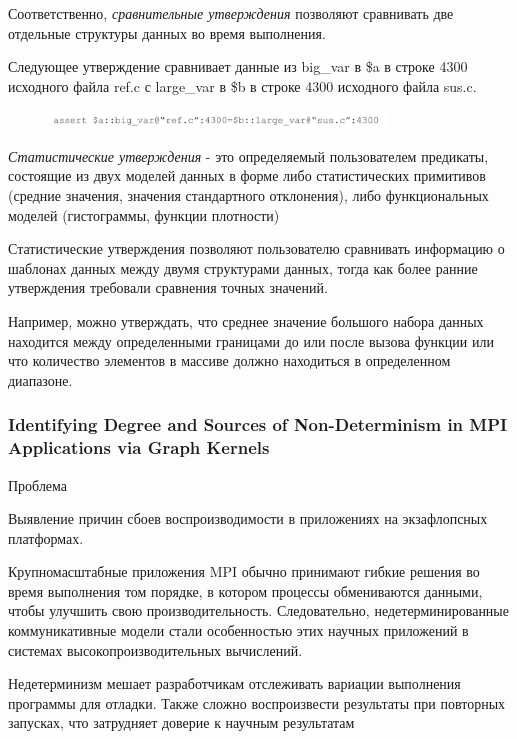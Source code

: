 Соответственно, \textit{сравнительные утверждения} позволяют сравнивать две отдельные структуры данных во время выполнения.

Следующее утверждение сравнивает данные из big_var в \$a в строке 4300 исходного файла ref.c с large_var в \$b в строке 4300 исходного файла sus.c.

\begin{figure}[h]
	\includegraphics[width=0.8\textwidth]{ResearchNotes/rndhpc_not_edt_2021_11_10/krekhtunova/assert2.png}
\end{figure}

\textit{Статистические утверждения} - это определяемый пользователем предикаты, состоящие из двух моделей данных в форме либо статистических примитивов (средние значения, значения стандартного отклонения), либо функциональных моделей (гистограммы, функции плотности)

Статистические утверждения позволяют пользователю сравнивать информацию о шаблонах данных между двумя структурами данных, тогда как более ранние утверждения требовали сравнения точных значений.

Например, можно утверждать, что среднее значение большого набора данных находится между определенными границами до или после вызова функции или что количество элементов в массиве должно находиться в определенном диапазоне.

\subsubsection{Identifying Degree and Sources of Non-Determinism in MPI Applications via Graph Kernels}

Проблема

Выявление причин сбоев воспроизводимости в приложениях на экзафлопсных платформах.

Крупномасштабные приложения MPI обычно принимают гибкие решения во время выполнения том порядке, в котором процессы обмениваются данными, чтобы улучшить свою производительность. Следовательно, недетерминированные коммуникативные модели стали особенностью этих научных приложений в системах высокопроизводительных вычислений.

Недетерминизм мешает разработчикам отслеживать вариации выполнения программы для отладки. Также сложно воспроизвести результаты при повторных запусках, что затрудняет доверие к научным результатам
\newline

